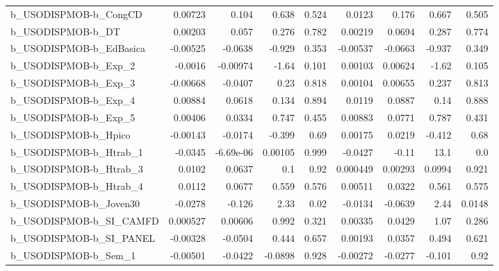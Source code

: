 \begin{tabular}{lrrrrrrrr}
b\_USODISPMOB-b\_CongCD      &     0.00723 &        0.104 &    0.638 &    0.524 &     0.0123 &       0.176 &        0.667 &         0.505 \\
b\_USODISPMOB-b\_DT          &     0.00203 &        0.057 &    0.276 &    0.782 &    0.00219 &      0.0694 &        0.287 &         0.774 \\
b\_USODISPMOB-b\_EdBasica    &    -0.00525 &      -0.0638 &   -0.929 &    0.353 &   -0.00537 &     -0.0663 &       -0.937 &         0.349 \\
b\_USODISPMOB-b\_Exp\_2       &     -0.0016 &     -0.00974 &    -1.64 &    0.101 &    0.00103 &     0.00624 &        -1.62 &         0.105 \\
b\_USODISPMOB-b\_Exp\_3       &    -0.00668 &      -0.0407 &     0.23 &    0.818 &    0.00104 &     0.00655 &        0.237 &         0.813 \\
b\_USODISPMOB-b\_Exp\_4       &     0.00884 &       0.0618 &    0.134 &    0.894 &     0.0119 &      0.0887 &         0.14 &         0.888 \\
b\_USODISPMOB-b\_Exp\_5       &     0.00406 &       0.0334 &    0.747 &    0.455 &    0.00883 &      0.0771 &        0.787 &         0.431 \\
b\_USODISPMOB-b\_Hpico       &    -0.00143 &      -0.0174 &   -0.399 &     0.69 &    0.00175 &      0.0219 &       -0.412 &          0.68 \\
b\_USODISPMOB-b\_Htrab\_1     &     -0.0345 &    -6.69e-06 &  0.00105 &    0.999 &    -0.0427 &       -0.11 &         13.1 &           0.0 \\
b\_USODISPMOB-b\_Htrab\_3     &      0.0102 &       0.0637 &      0.1 &     0.92 &   0.000449 &     0.00293 &       0.0994 &         0.921 \\
b\_USODISPMOB-b\_Htrab\_4     &      0.0112 &       0.0677 &    0.559 &    0.576 &    0.00511 &      0.0322 &        0.561 &         0.575 \\
b\_USODISPMOB-b\_Joven30     &     -0.0278 &       -0.126 &     2.33 &     0.02 &    -0.0134 &     -0.0639 &         2.44 &        0.0148 \\
b\_USODISPMOB-b\_SI\_CAMFD    &    0.000527 &      0.00606 &    0.992 &    0.321 &    0.00335 &      0.0429 &         1.07 &         0.286 \\
b\_USODISPMOB-b\_SI\_PANEL    &    -0.00328 &      -0.0504 &    0.444 &    0.657 &    0.00193 &      0.0357 &        0.494 &         0.621 \\
b\_USODISPMOB-b\_Sem\_1       &    -0.00501 &      -0.0422 &  -0.0898 &    0.928 &   -0.00272 &     -0.0277 &       -0.101 &          0.92 \\

\end{tabular}
